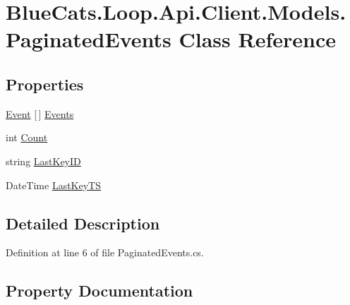 \hypertarget{class_blue_cats_1_1_loop_1_1_api_1_1_client_1_1_models_1_1_paginated_events}{}\section{Blue\+Cats.\+Loop.\+Api.\+Client.\+Models.\+Paginated\+Events Class Reference}
\label{class_blue_cats_1_1_loop_1_1_api_1_1_client_1_1_models_1_1_paginated_events}
\subsection*{Properties}
\begin{DoxyCompactItemize}
\item 
\mbox{\hyperlink{class_blue_cats_1_1_loop_1_1_api_1_1_client_1_1_models_1_1_event}{Event}} \mbox{[}$\,$\mbox{]} \mbox{\hyperlink{class_blue_cats_1_1_loop_1_1_api_1_1_client_1_1_models_1_1_paginated_events_a8631b1645d803b50225c53189687d19b}{Events}}
\item 
int \mbox{\hyperlink{class_blue_cats_1_1_loop_1_1_api_1_1_client_1_1_models_1_1_paginated_events_a407a6c5221bfd116f3997058ff42a9e9}{Count}}
\item 
string \mbox{\hyperlink{class_blue_cats_1_1_loop_1_1_api_1_1_client_1_1_models_1_1_paginated_events_a0ffe6e7f99f6dc05a5f398283f738a8a}{Last\+Key\+ID}}
\item 
Date\+Time \mbox{\hyperlink{class_blue_cats_1_1_loop_1_1_api_1_1_client_1_1_models_1_1_paginated_events_ad969ee23be5f52022d86bdadb3bc0ce2}{Last\+Key\+TS}}
\end{DoxyCompactItemize}


\subsection{Detailed Description}


Definition at line 6 of file Paginated\+Events.\+cs.



\subsection{Property Documentation}
\mbox{\label{class_blue_cats_1_1_loop_1_1_api_1_1_client_1_1_models_1_1_paginated_events_a407a6c5221bfd116f3997058ff42a9e9}} 

